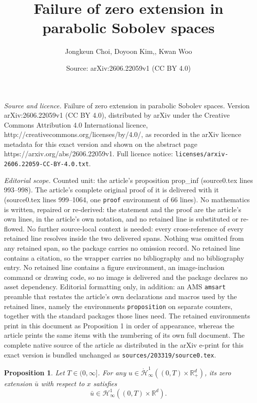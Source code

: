 \documentclass[10pt,a4paper]{amsart}
\title{Failure of zero extension in parabolic Sobolev spaces}
\author{Jongkeun Choi, Doyoon Kim,, Kwan Woo}
\date{Source: arXiv:2606.22059v1 (CC BY 4.0)}
\newtheorem{proposition}{Proposition}
\def\bR{\mathbb{R}}
\def\cH{\mathcal{H}}
\begin{document}
\maketitle

\noindent\emph{Source and licence.} Failure of zero extension in parabolic Sobolev spaces. Version arXiv:2606.22059v1 (CC BY 4.0), distributed by arXiv under the Creative Commons Attribution 4.0 International licence, http://creativecommons.org/licenses/by/4.0/, as recorded in the arXiv licence metadata for this exact version and shown on the abstract page https://arxiv.org/abs/2606.22059v1. Full licence notice: \texttt{licenses/arxiv-2606.22059-CC-BY-4.0.txt}.\par\smallskip

\noindent\textit{Editorial scope.} Counted unit: the article's proposition prop\_inf (source0.tex lines 993--998). The article's complete original proof of it is delivered with it (source0.tex lines 999--1064, one \texttt{proof} environment of 66 lines). No mathematics is written, repaired or re-derived: the statement and the proof are the article's own lines, in the article's own notation, and no retained line is substituted or re-flowed.  No further source-local context is needed: every cross-reference of every retained line resolves inside the two delivered spans.  Nothing was omitted from any retained span, so the package carries no omission record.  No retained line contains a citation, so the wrapper carries no bibliography and no bibliography entry.  No retained line contains a figure environment, an image-inclusion command or drawing code, so no image is delivered and the package declares no asset dependency.  Editorial formatting only, in addition: an AMS \texttt{amsart} preamble that restates the article's own declarations and macros used by the retained lines, namely the environments \texttt{proposition} on separate counters, together with the standard packages those lines need.  The retained environments print in this document as Proposition 1 in order of appearance, whereas the article prints the same items with the numbering of its own full document.  The complete native source of the article as distributed in the arXiv e-print for this exact version is bundled unchanged as \texttt{sources/203319/source0.tex}.
\begin{proposition} \label{prop_inf}
Let $T \in (0, \infty]$. For any $u \in \mathring{\cH}^1_\infty((0,T)\times \bR^d_+)$, its zero extension $\bar{u}$ with respect to $x$ satisfies
$$
\bar{u} \in \cH^1_\infty((0,T)\times \bR^d).
$$
\end{proposition}
\end{document}
